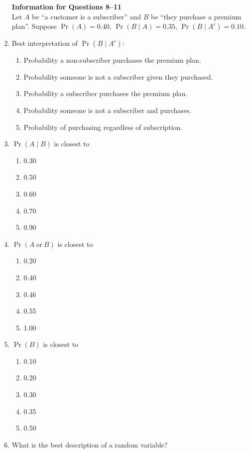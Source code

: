\documentclass{article}
\begin{document}
\begin{enumerate}
\textbf{Information for Questions 8--11}\\
Let $A$ be ``a customer is a subscriber'' and $B$ be ``they purchase a premium plan''. Suppose $\Pr(A)=0.40$, $\Pr(B\mid A)=0.35$, $\Pr(B\mid A^c)=0.10$.
\item Best interpretation of $\Pr(B\mid A^c)$:
    \begin{enumerate}[label=\Alph*.]
        \item Probability a non-subscriber purchases the premium plan.
        \item Probability someone is not a subscriber given they purchased.
        \item Probability a subscriber purchases the premium plan.
        \item Probability someone is not a subscriber and purchases.
        \item Probability of purchasing regardless of subscription.
    \end{enumerate}
\item $\Pr(A\mid B)$ is closest to
    \begin{enumerate}[label=\Alph*.]
        \item 0.30
        \item 0.50
        \item 0.60
        \item 0.70
        \item 0.90
    \end{enumerate}
\item $\Pr(A\ \text{or}\ B)$ is closest to
    \begin{enumerate}[label=\Alph*.]
        \item 0.20
        \item 0.40
        \item 0.46
        \item 0.55
        \item 1.00
    \end{enumerate}
\item $\Pr(B)$ is closest to
    \begin{enumerate}[label=\Alph*.]
        \item 0.10
        \item 0.20
        \item 0.30
        \item 0.35
        \item 0.50
    \end{enumerate}
\item What is the best description of a random variable?

\end{enumerate}
\end{document}
